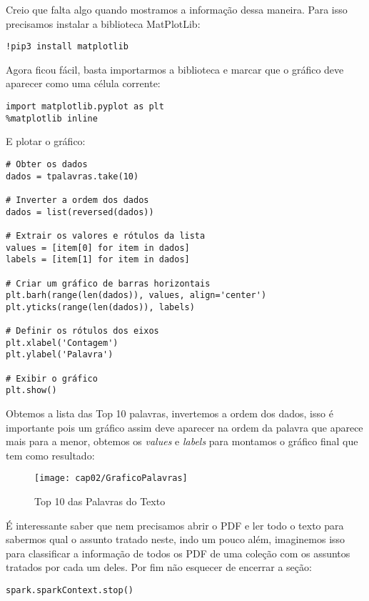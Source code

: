 Creio que falta algo quando mostramos a informação dessa maneira. Para isso precisamos instalar a biblioteca MatPlotLib:
\begin{lstlisting}[]
!pip3 install matplotlib
\end{lstlisting}

Agora ficou fácil, basta importarmos a biblioteca e marcar que o gráfico deve aparecer como uma célula corrente:
\begin{lstlisting}[]
import matplotlib.pyplot as plt
%matplotlib inline
\end{lstlisting}

E plotar o gráfico:
\begin{lstlisting}[]
# Obter os dados
dados = tpalavras.take(10)

# Inverter a ordem dos dados
dados = list(reversed(dados))

# Extrair os valores e rótulos da lista
values = [item[0] for item in dados]
labels = [item[1] for item in dados]

# Criar um gráfico de barras horizontais
plt.barh(range(len(dados)), values, align='center')
plt.yticks(range(len(dados)), labels)

# Definir os rótulos dos eixos
plt.xlabel('Contagem')
plt.ylabel('Palavra')

# Exibir o gráfico
plt.show()
\end{lstlisting}

Obtemos a lista das Top 10 palavras, invertemos a ordem dos dados, isso é importante pois um gráfico assim deve aparecer na ordem da palavra que aparece mais para a menor, obtemos os \textit{values} e \textit{labels} para montamos o gráfico final que tem como resultado:
\begin{figure}[H]
	\centering\texttt{[image: cap02/GraficoPalavras]}
	\caption{Top 10 das Palavras do Texto}
\end{figure}

É interessante saber que nem precisamos abrir o PDF e ler todo o texto para sabermos qual o assunto tratado neste, indo um pouco além, imaginemos isso para classificar a informação de todos os PDF de uma coleção com os assuntos tratados por cada um deles. Por fim não esquecer de encerrar a seção:
\begin{lstlisting}[]
spark.sparkContext.stop()
\end{lstlisting}

\clearpage